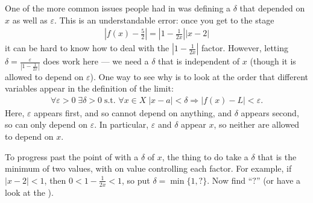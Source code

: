 \documentclass[letterpaper,10pt,english]{jupyterBook}
\begin{document}
\label{\detokenize{HW-feedback:iiifeedback}}
\sphinxAtStartPar
One of the more common issues people had in {\hyperref[\detokenize{Problems:id3}]{}} was defining a \(\delta\) that depended on \(x\) as well as \(\varepsilon\). This is an understandable error: once you get to the stage
\begin{equation}\label{equation:HW-feedback:hw1}
\begin{split}\left|f(x)-\frac{5}{2}\right|=\left|1-\frac{1}{2x}\right||x-2|\end{split}
\end{equation}
\sphinxAtStartPar
it can be hard to know how to deal with the \(\left|1-\frac{1}{2x}\right|\) factor. However, letting \(\delta=\frac{\varepsilon}{|1-\frac{1}{2x}|}\) does  work here — we need a \(\delta\) that is independent of \(x\) (though it is allowed to depend on \(\varepsilon\)). One way to see why is to look at the order that different variables appear in the definition of the limit:
\begin{equation*}
\begin{split}
\forall\varepsilon>0\;\exists\delta>0\;\text{s.t. }\forall x\in X \; |x-a|<\delta\Rightarrow|f(x)-L|<\varepsilon.
\end{split}
\end{equation*}
\sphinxAtStartPar
Here, \(\varepsilon\) appears first, and so cannot depend on anything, and \(\delta\) appears second, so can only depend on \(\varepsilon\). In particular, \(\varepsilon\) and \(\delta\) appear  \(x\), so neither are allowed to depend on \(x\).

\sphinxAtStartPar
To progress past the point of {\hyperref[\detokenize{HW-feedback:equation-hw1}]{}} with a \(\delta\)  of \(x\), the thing to do take a \(\delta\) that is the minimum of two values, with on value controlling each factor. For example, if \(|x-2|<1\), then \(0<1-\frac{1}{2x}<1\), so put \(\delta=\min\{1,\text{?}\}\). Now find “\(\text{?}\)” (or have a look at the {\hyperref[\detokenize{Solutions-upto46:iiisol}]{}}).







\renewcommand{\indexname}{Index}
\printindex
\end{document}
